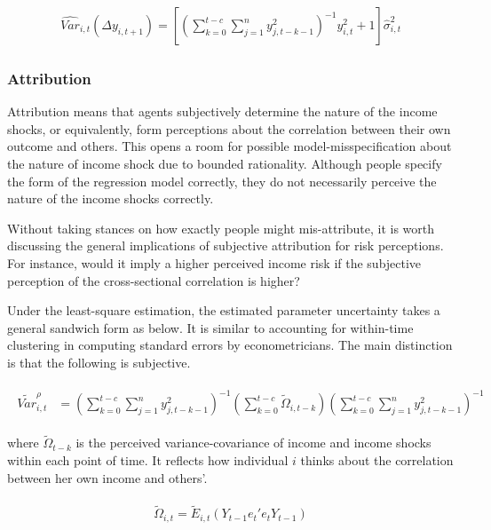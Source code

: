 \documentclass[12pt,notitlepage,onecolumn,aps,pra]{article}
\begin{document}
\begin{eqnarray}
\widehat{Var}_{i,t}(\Delta y_{i,t+1}) = [(\sum^{t-c}_{k=0}\sum^{n}_{j=1}y^2_{j,t-k-1})^{-1}y^2_{i,t} + 1] \hat{\sigma}^2_{i,t}
\end{eqnarray}

    \hypertarget{attribution}{%
\subsubsection{Attribution}\label{attribution}}

Attribution means that agents subjectively determine the nature of the
income shocks, or equivalently, form perceptions about the correlation
between their own outcome and others. This opens a room for possible
model-misspecification about the nature of income shock due to bounded
rationality. Although people specify the form of the regression model
correctly, they do not necessarily perceive the nature of the income
shocks correctly.

Without taking stances on how exactly people might mis-attribute, it is
worth discussing the general implications of subjective attribution for
risk perceptions. For instance, would it imply a higher perceived income
risk if the subjective perception of the cross-sectional correlation is
higher?

Under the least-square estimation, the estimated parameter uncertainty
takes a general sandwich form as below. It is similar to accounting for
within-time clustering in computing standard errors by econometricians.
The main distinction is that the following is subjective.

\begin{eqnarray}
\begin{split}
\tilde {Var}^{\rho}_{i,t} & =   (\sum^{t-c}_{k=0}\sum^{n}_{j=1}y^2_{j,t-k-1})^{-1}(\sum^{t-c}_{k=0}\tilde \Omega_{i,t-k})(\sum^{t-c}_{k=0}\sum^{n}_{j=1}y^2_{j,t-k-1})^{-1}
\end{split}
\end{eqnarray}

where \(\tilde \Omega_{t-k}\) is the perceived variance-covariance of
income and income shocks within each point of time. It reflects how
individual \(i\) thinks about the correlation between her own income and
others'.

\begin{eqnarray}
\begin{split}
\tilde \Omega_{i,t} = \tilde E_{i,t}(Y_{t-1}e_{t}'e_{t}Y_{t-1})
\end{split}
\end{eqnarray}
\end{document}
